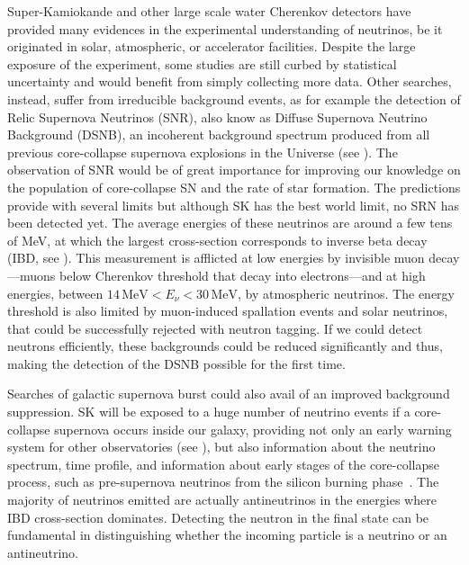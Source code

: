 Super-Kamiokande and other large scale water Cherenkov detectors have provided %
many evidences in the experimental understanding of neutrinos, %
be it originated in solar, atmospheric, or accelerator facilities.
Despite the large exposure of the experiment, some studies are still curbed by statistical uncertainty %
and would benefit from simply collecting more data.
Other searches, instead, suffer from irreducible background events, as for example the detection of Relic Supernova Neutrinos (SNR), %
also know as Diffuse Supernova Neutrino Background (DSNB), an incoherent background spectrum %
produced from all previous core-collapse supernova explosions in the Universe (see ).
The observation of SNR would be of great importance for improving our knowledge on the population of core-collapse SN %
and the rate of star formation.
The predictions provide with several limits but although SK has the best world limit, no SRN has been detected yet.
The average energies of these neutrinos are around a few tens of MeV, at which the largest cross-section %
corresponds to inverse beta decay (IBD, see ).
This measurement is afflicted at low energies by invisible muon decay%
---muons below Cherenkov threshold that decay into electrons---and at high energies, %
between $14\,\text{MeV} < E_\nu < 30\,\text{MeV}$, by atmospheric neutrinos.
The energy threshold is also limited by muon-induced spallation events and solar neutrinos, that could be successfully %
rejected with neutron tagging.
If we could detect neutrons efficiently, these backgrounds could be reduced significantly and thus, %
making the detection of the DSNB possible for the first time.

Searches of galactic supernova burst could also avail of an improved background suppression.
SK will be exposed to a huge number of neutrino events if a core-collapse supernova occurs inside our galaxy, %
providing not only an early warning system for other observatories (see ), %
but also information about the neutrino spectrum, time profile, and information about early stages of the core-collapse process, %
such as pre-supernova neutrinos from the silicon burning phase~\cite{Simpson:2019xwo}.
The majority of neutrinos emitted are actually antineutrinos in the energies where IBD cross-section dominates.
Detecting the neutron in the final state can be fundamental in distinguishing whether the incoming particle is %
a neutrino or an antineutrino.

